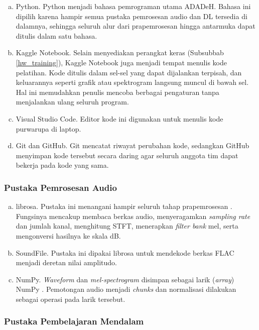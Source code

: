 \begin{enumerate}[(a).]
  \item Python. Python menjadi bahasa pemrograman utama ADADeH. Bahasa ini dipilih karena hampir semua pustaka pemrosesan audio dan DL tersedia di dalamnya, sehingga seluruh alur dari prapemrosesan hingga antarmuka dapat ditulis dalam satu bahasa.
  \item Kaggle Notebook. Selain menyediakan perangkat keras (Subsubbab \ref{hw_training}), Kaggle Notebook juga menjadi tempat menulis kode pelatihan. Kode ditulis dalam sel-sel yang dapat dijalankan terpisah, dan keluarannya seperti grafik atau spektrogram langsung muncul di bawah sel. Hal ini memudahkan penulis mencoba berbagai pengaturan tanpa menjalankan ulang seluruh program.
  \item Visual Studio Code. Editor kode ini digunakan untuk menulis kode purwarupa di laptop.
  \item Git dan GitHub. Git mencatat riwayat perubahan kode, sedangkan GitHub menyimpan kode tersebut secara daring agar seluruh anggota tim dapat bekerja pada kode yang sama.
\end{enumerate}

\subsubsection{Pustaka Pemrosesan Audio}
\label{sw_audio}

\begin{enumerate}[(a).]
  \item librosa. Pustaka ini menangani hampir seluruh tahap prapemrosesan \autocite{mcfee2015librosa}. Fungsinya mencakup membaca berkas audio, menyeragamkan \textit{sampling rate} dan jumlah kanal, menghitung STFT, menerapkan \textit{filter bank} mel, serta mengonversi hasilnya ke skala dB.
  \item SoundFile. Pustaka ini dipakai librosa untuk mendekode berkas FLAC menjadi deretan nilai amplitudo.
  \item NumPy. \textit{Waveform} dan \textit{mel-spectrogram} disimpan sebagai larik (\textit{array}) NumPy \autocite{harris2020numpy}. Pemotongan audio menjadi \textit{chunks} dan normalisasi dilakukan sebagai operasi pada larik tersebut.
\end{enumerate}

\subsubsection{Pustaka Pembelajaran Mendalam}
\label{sw_dl}

